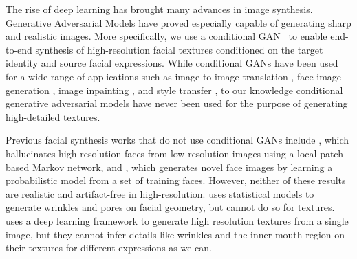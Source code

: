 The rise of deep learning has brought many advances in image synthesis. Generative Adversarial Models \cite{gan} have proved especially capable of generating sharp and realistic images. 
More specifically, we use a conditional GAN~\cite{cgan} to enable end-to-end synthesis of high-resolution facial textures conditioned on the target identity and source facial expressions. While conditional GANs have been used for a wide range of applications such as image-to-image translation \cite{pix2pix}, face image generation \cite{gauthier2014}, image inpainting \cite{pathak2016context}, and style transfer \cite{li2016precomputed}, to our knowledge conditional generative adversarial models have never been used for the purpose of generating high-detailed textures.

Previous facial synthesis works that do not use conditional GANs include  \cite{liu2007face}, which hallucinates high-resolution faces from low-resolution images using a local patch-based Markov network, and
\cite{mohammed2009visio}, which generates novel face images by learning a probabilistic model from a set of training faces. 
However, neither of these results are realistic and artifact-free in high-resolution. \cite{golovinskiy2006statistical} uses statistical models to generate wrinkles and pores on facial geometry, but cannot do so for textures. \cite{saito2016} uses a deep learning framework to generate high resolution textures from a single image, but they cannot infer details like wrinkles and the inner mouth region on their textures for different expressions as we can.
